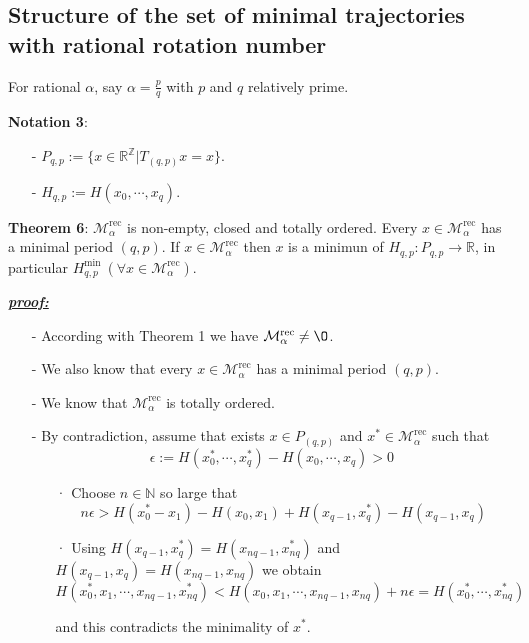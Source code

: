 \documentclass{article}
\begin{document}
\subsection{Structure of the set of minimal trajectories with rational rotation number}


\noindent For rational $\alpha$, say $\alpha = \frac{p}{q}$ with $p$ and $q$ relatively prime. 


\noindent \textbf{Notation 3}: 
	\begin{itemize}
		\item[-] $P_{q, p} := \{ x \in \mathbb{R}^{\mathbb{Z}} | T_{(q, p)} x = x \}$.
		\item[-] $H_{q, p} := H(x_0, \cdots, x_q)$.
	\end{itemize}


\noindent \textbf{Theorem 6}: $\mathcal{M}_{\alpha}^{\text{rec}}$ is non-empty, closed and totally ordered. Every $x \in \mathcal{M}_{\alpha}^{\text{rec}}$ has a minimal period $(q, p)$. If $x \in \mathcal{M}_{\alpha}^{\text{rec}}$ then $x$ is a minimun of $H_{q, p}: P_{q, p} \rightarrow \mathbb{R}$, in particular $H_{q, p}^{\text{min}} \ (\forall x \in \mathcal{M}_{\alpha}^{\text{rec}} )$.


\color{blue}
	\noindent \underline{\textbf{\textit{proof:}}} 		

		\begin{itemize}
			\item[-] According with Theorem 1 we have $\mathcal{M}_{\alpha}^{\text{rec}} \neq \O$.
			\item[-] We also know that every $x \in \mathcal{M}_{\alpha}^{\text{rec}}$ has a minimal period $(q, p)$. 
			\item[-] We know that $\mathcal{M}_{\alpha}^{\text{rec}}$ is totally ordered.
			\item[-] By contradiction, assume that exists $x \in P_{(q, p)}$ and $x^{*} \in \mathcal{M}_{\alpha}^{\text{rec}}$ such that
				$$
					\epsilon := H ( x_{0}^{*}, \cdots, x_{q}^{*} ) - H ( x_{0}, \cdots, x_{q} ) > 0
				$$
				\begin{itemize}
					\item[·] Choose $n \in \mathbb{N}$ so large that
						$$
							n \epsilon > H(x_{0}^{*} - x_1) - H(x_0, x_1) + H(x_{q - 1}, x_{q}^{*}) - H(x_{q - 1}, x_q)
						$$
					\item[·] Using $H ( x_{q - 1}, x_{q}^{*}) = H ( x_{nq - 1}, x_{nq}^{*})$ and $H ( x_{q - 1}, x_{q}) = H ( x_{nq - 1}, x_{nq})$ we obtain
						$$
							H(x_{0}^{*}, x_1, \cdots, x_{nq - 1}, x_{nq}^{*}) < H( x_0, x_1, \cdots, x_{nq - 1}, x_{nq}) + n \epsilon = H (x_{0}^{*}, \cdots, x_{nq}^{*})
						$$
						
						and this contradicts the minimality of $x^{*}$.
						
				\end{itemize}
		\end{itemize}
	
\end{document}
